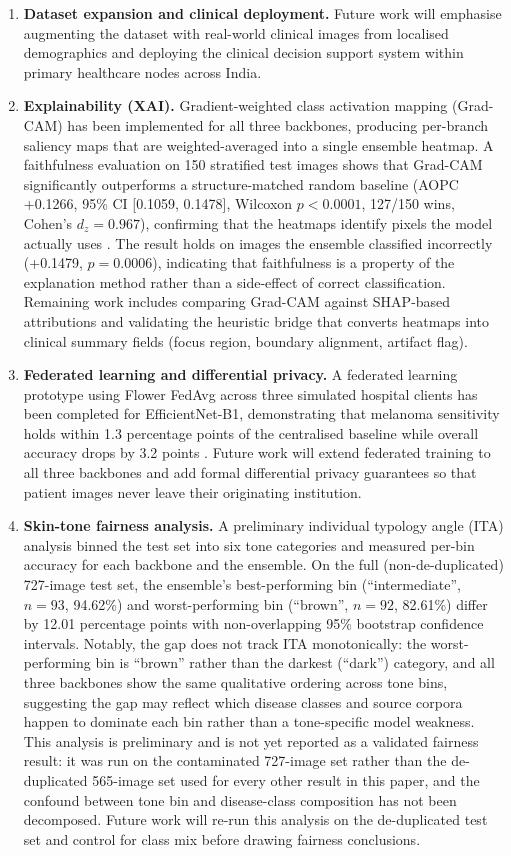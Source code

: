 \documentclass[pdflatex,sn-mathphys-num]{sn-jnl}%
\begin{document}
\begin{enumerate}
\item \textbf{Dataset expansion and clinical deployment.} Future work will emphasise
augmenting the dataset with real-world clinical images from localised demographics and
deploying the clinical decision support system within primary healthcare nodes across India.
\item \textbf{Explainability (XAI).} Gradient-weighted class activation mapping (Grad-CAM) has
been implemented for all three backbones, producing per-branch saliency maps that are
weighted-averaged into a single ensemble heatmap. A faithfulness evaluation on 150 stratified
test images shows that Grad-CAM significantly outperforms a structure-matched random baseline
(AOPC +0.1266, 95\% CI [0.1059, 0.1478], Wilcoxon $p < 0.0001$, 127/150 wins, Cohen's
$d_z = 0.967$), confirming that the heatmaps identify pixels the model actually uses
\cite{ref21,ref22}. The result holds on images the ensemble classified incorrectly (+0.1479,
$p = 0.0006$), indicating that faithfulness is a property of the explanation method rather
than a side-effect of correct classification. Remaining work includes comparing Grad-CAM
against SHAP-based attributions and validating the heuristic bridge that converts heatmaps
into clinical summary fields (focus region, boundary alignment, artifact flag).
\item \textbf{Federated learning and differential privacy.} A federated learning prototype
using Flower FedAvg across three simulated hospital clients has been completed for
EfficientNet-B1, demonstrating that melanoma sensitivity holds within 1.3 percentage points of
the centralised baseline while overall accuracy drops by 3.2 points \cite{ref24}. Future work
will extend federated training to all three backbones and add formal differential privacy
guarantees so that patient images never leave their originating institution.
\item \textbf{Skin-tone fairness analysis.} A preliminary individual typology angle (ITA)
analysis binned the test set into six tone categories and measured per-bin accuracy for each
backbone and the ensemble. On the full (non-de-duplicated) 727-image test set, the ensemble's
best-performing bin (``intermediate'', $n=93$, 94.62\%) and worst-performing bin (``brown'',
$n=92$, 82.61\%) differ by 12.01 percentage points with non-overlapping 95\% bootstrap
confidence intervals. Notably, the gap does not track ITA monotonically: the worst-performing
bin is ``brown'' rather than the darkest (``dark'') category, and all three backbones show the
same qualitative ordering across tone bins, suggesting the gap may reflect which disease
classes and source corpora happen to dominate each bin rather than a tone-specific model
weakness. This analysis is preliminary and is not yet reported as a validated fairness result:
it was run on the contaminated 727-image set rather than the de-duplicated 565-image set used
for every other result in this paper, and the confound between tone bin and disease-class
composition has not been decomposed. Future work will re-run this analysis on the
de-duplicated test set and control for class mix before drawing fairness conclusions.
\end{enumerate}
\end{document}
